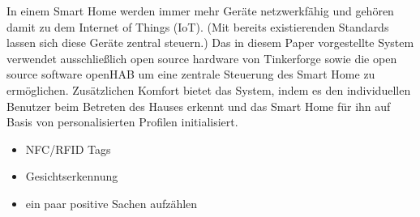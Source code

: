 %
In einem Smart Home werden immer mehr Geräte netzwerkfähig und gehören damit zu dem Internet of Things (IoT).
(Mit bereits existierenden Standards lassen sich diese Geräte zentral steuern.)
Das in diesem Paper vorgestellte System verwendet ausschließlich open source hardware von Tinkerforge sowie die open source software openHAB
um eine zentrale Steuerung des Smart Home zu ermöglichen.
Zusätzlichen Komfort bietet das System, indem es den individuellen Benutzer beim Betreten des Hauses erkennt und das Smart Home für ihn auf Basis von personalisierten Profilen initialisiert.
\begin{itemize}
	\item NFC/RFID Tags
	\item Gesichtserkennung
	\item ein paar positive Sachen aufzählen
\end{itemize}
